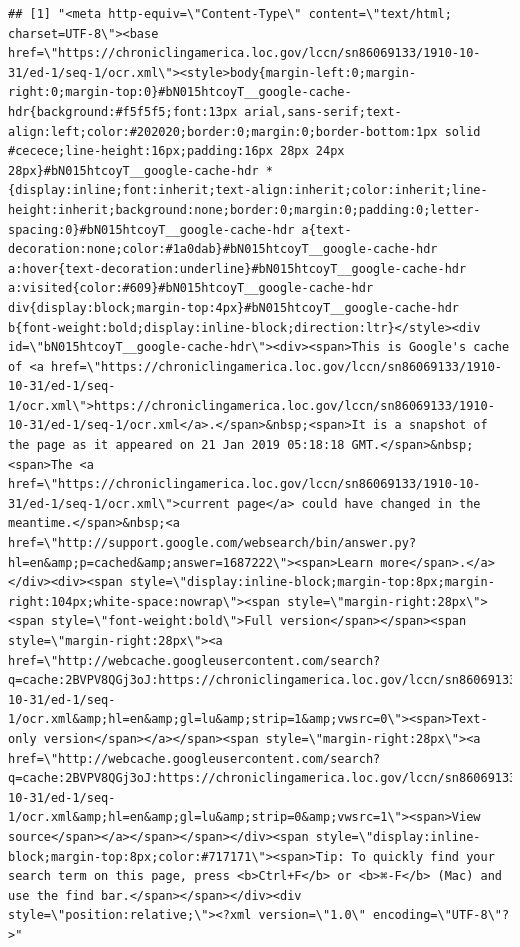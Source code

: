 \documentclass[
]{article}
\begin{document}
\begin{verbatim}
## [1] "<meta http-equiv=\"Content-Type\" content=\"text/html; charset=UTF-8\"><base href=\"https://chroniclingamerica.loc.gov/lccn/sn86069133/1910-10-31/ed-1/seq-1/ocr.xml\"><style>body{margin-left:0;margin-right:0;margin-top:0}#bN015htcoyT__google-cache-hdr{background:#f5f5f5;font:13px arial,sans-serif;text-align:left;color:#202020;border:0;margin:0;border-bottom:1px solid #cecece;line-height:16px;padding:16px 28px 24px 28px}#bN015htcoyT__google-cache-hdr *{display:inline;font:inherit;text-align:inherit;color:inherit;line-height:inherit;background:none;border:0;margin:0;padding:0;letter-spacing:0}#bN015htcoyT__google-cache-hdr a{text-decoration:none;color:#1a0dab}#bN015htcoyT__google-cache-hdr a:hover{text-decoration:underline}#bN015htcoyT__google-cache-hdr a:visited{color:#609}#bN015htcoyT__google-cache-hdr div{display:block;margin-top:4px}#bN015htcoyT__google-cache-hdr b{font-weight:bold;display:inline-block;direction:ltr}</style><div id=\"bN015htcoyT__google-cache-hdr\"><div><span>This is Google's cache of <a href=\"https://chroniclingamerica.loc.gov/lccn/sn86069133/1910-10-31/ed-1/seq-1/ocr.xml\">https://chroniclingamerica.loc.gov/lccn/sn86069133/1910-10-31/ed-1/seq-1/ocr.xml</a>.</span>&nbsp;<span>It is a snapshot of the page as it appeared on 21 Jan 2019 05:18:18 GMT.</span>&nbsp;<span>The <a href=\"https://chroniclingamerica.loc.gov/lccn/sn86069133/1910-10-31/ed-1/seq-1/ocr.xml\">current page</a> could have changed in the meantime.</span>&nbsp;<a href=\"http://support.google.com/websearch/bin/answer.py?hl=en&amp;p=cached&amp;answer=1687222\"><span>Learn more</span>.</a></div><div><span style=\"display:inline-block;margin-top:8px;margin-right:104px;white-space:nowrap\"><span style=\"margin-right:28px\"><span style=\"font-weight:bold\">Full version</span></span><span style=\"margin-right:28px\"><a href=\"http://webcache.googleusercontent.com/search?q=cache:2BVPV8QGj3oJ:https://chroniclingamerica.loc.gov/lccn/sn86069133/1910-10-31/ed-1/seq-1/ocr.xml&amp;hl=en&amp;gl=lu&amp;strip=1&amp;vwsrc=0\"><span>Text-only version</span></a></span><span style=\"margin-right:28px\"><a href=\"http://webcache.googleusercontent.com/search?q=cache:2BVPV8QGj3oJ:https://chroniclingamerica.loc.gov/lccn/sn86069133/1910-10-31/ed-1/seq-1/ocr.xml&amp;hl=en&amp;gl=lu&amp;strip=0&amp;vwsrc=1\"><span>View source</span></a></span></span></div><span style=\"display:inline-block;margin-top:8px;color:#717171\"><span>Tip: To quickly find your search term on this page, press <b>Ctrl+F</b> or <b>⌘-F</b> (Mac) and use the find bar.</span></span></div><div style=\"position:relative;\"><?xml version=\"1.0\" encoding=\"UTF-8\"?>"
\end{verbatim}
\end{document}
